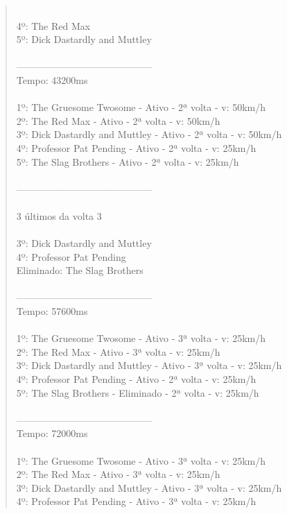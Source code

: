 \documentclass[paper=a4, fontsize=11pt]{scrartcl}
\numberwithin{equation}{section}		%
\numberwithin{figure}{section}			%
\numberwithin{table}{section}				%
\begin{document}
\begin{quote}
\\4º: The Red Max
\\5º: Dick Dastardly and Muttley
\\
\\------------------------------------------
\\Tempo: 43200ms
\\
\\1º: The Gruesome Twosome - Ativo - 2ª volta - v: 50km/h
\\2º: The Red Max - Ativo - 2ª volta - v: 50km/h
\\3º: Dick Dastardly and Muttley - Ativo - 2ª volta - v: 50km/h
\\4º: Professor Pat Pending - Ativo - 2ª volta - v: 25km/h
\\5º: The Slag Brothers - Ativo - 2ª volta - v: 25km/h
\\
\\------------------------------------------
\\
\\3 últimos da volta 3
\\
\\3º: Dick Dastardly and Muttley
\\4º: Professor Pat Pending
\\Eliminado: The Slag Brothers
\\
\\------------------------------------------
\\Tempo: 57600ms
\\
\\1º: The Gruesome Twosome - Ativo - 3ª volta - v: 25km/h
\\2º: The Red Max - Ativo - 3ª volta - v: 25km/h
\\3º: Dick Dastardly and Muttley - Ativo - 3ª volta - v: 25km/h
\\4º: Professor Pat Pending - Ativo - 2ª volta - v: 25km/h
\\5º: The Slag Brothers - Eliminado - 2ª volta - v: 25km/h
\\
\\------------------------------------------
\\Tempo: 72000ms
\\
\\1º: The Gruesome Twosome - Ativo - 3ª volta - v: 25km/h
\\2º: The Red Max - Ativo - 3ª volta - v: 25km/h
\\3º: Dick Dastardly and Muttley - Ativo - 3ª volta - v: 25km/h
\\4º: Professor Pat Pending - Ativo - 3ª volta - v: 25km/h

\end{quote}
\end{document}
